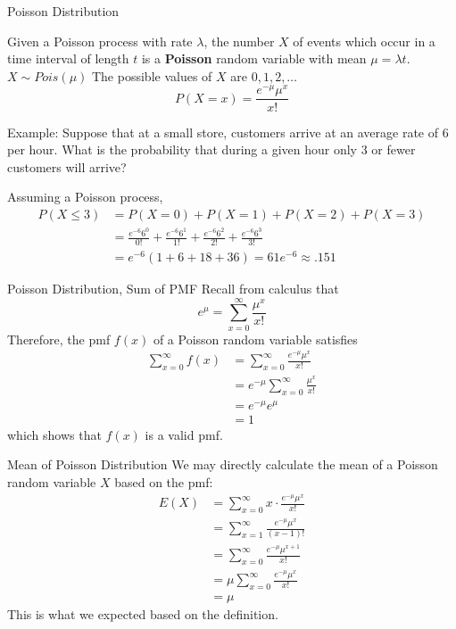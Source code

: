 \documentclass[]{beamer}
\begin{document}
    \begin{frame}{Poisson Distribution}
    \begin{block}{}
    Given a Poisson process with rate $\lambda$, the number $X$ of events which occur in a time interval of length $t$ is a \textbf{Poisson} random variable with mean $\mu=\lambda t$. $X\sim Pois(\mu)$ The possible values of $X$ are $0, 1, 2,\dots$
    $$P(X=x)=\frac{e^{-\mu}\mu^x}{x!}$$
    \end{block}
    
    \pause \vspace{.1cm} Example: Suppose that at a small store, customers arrive at an average rate of 6 per hour. What is the probability that during a given hour only 3 or fewer customers will arrive?
    
    \pause \vspace{.3cm}Assuming a Poisson process,
    \begin{align*}
    P(X\leq 3) &= P(X=0)+P(X=1)+P(X=2)+P(X=3) \\
    &= \frac{e^{-6}6^0}{0!} + \frac{e^{-6}6^1}{1!} + \frac{e^{-6}6^2}{2!} + \frac{e^{-6}6^3}{3!} \\
    &= e^{-6} (1+6 + 18 + 36) = 61e^{-6} \approx .151
    \end{align*}
    \end{frame}

    \begin{frame}{Poisson Distribution, Sum of PMF}
    Recall from calculus that
    $$e^\mu=\sum_{x=0}^\infty \frac{\mu^x}{x!}$$
    \pause Therefore, the pmf $f(x)$ of a Poisson random variable satisfies
    \begin{align*}
    \sum_{x=0}^\infty f(x) &= \sum_{x=0}^\infty \frac{e^{-\mu}\mu^x}{x!} \\
    &= e^{-\mu} \sum_{x=0}^\infty \frac{\mu^x}{x!}\\
    &=e^{-\mu}e^\mu\\
    &=1
    \end{align*}
    which shows that $f(x)$ is a valid pmf.
    \end{frame}
    
    \begin{frame}{Mean of Poisson Distribution}
    We may directly calculate the mean of a Poisson random variable $X$ based on the pmf:
    \pause \begin{align*}
    E(X) &= \sum_{x=0}^\infty x\cdot\frac{e^{-\mu}\mu^x}{x!} \\
    &= \sum_{x=1}^\infty \frac{e^{-\mu}\mu^x}{(x-1)!} \\
    &= \sum_{x=0}^\infty \frac{e^{-\mu}\mu^{x+1}}{x!} \\
    &= \mu \sum_{x=0}^\infty \frac{e^{-\mu}\mu^x}{x!} \\
    &= \mu
    \end{align*}
    This is what we expected based on the definition.
    \end{frame}
    
\end{document}
